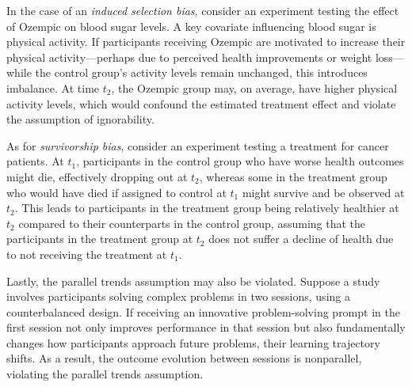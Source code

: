 In the case of an \emph{induced selection bias}, consider an experiment testing the effect of Ozempic on blood sugar levels. A key covariate influencing blood sugar is physical activity. If participants receiving Ozempic are motivated to increase their physical activity---perhaps due to perceived health improvements or weight loss---while the control group’s activity levels remain unchanged, this introduces imbalance. At time \(t_2\), the Ozempic group may, on average, have higher physical activity levels, which would confound the estimated treatment effect and violate the assumption of ignorability.


As for \emph{survivorship bias}, consider an experiment testing a treatment for cancer patients. At \(t_1\), participants in the control group who have worse health outcomes might die, effectively dropping out at \(t_2\), whereas some in the treatment group who would have died if assigned to control at \(t_1\) might survive and be observed at \(t_2\). This leads to participants in the treatment group being relatively healthier at \(t_2\) compared to their counterparts in the control group, assuming that the participants in the treatment group at $t_2$ does not suffer a decline of health due to not receiving the treatment at $t_1$.

Lastly, the parallel trends assumption may also be violated. Suppose a study involves participants solving complex problems in two sessions, using a counterbalanced design. If receiving an innovative problem-solving prompt in the first session not only improves performance in that session but also fundamentally changes how participants approach future problems, their learning trajectory shifts. As a result, the outcome evolution between sessions is nonparallel, violating the parallel trends assumption.  
